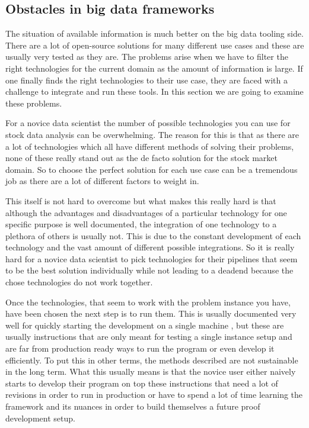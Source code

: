 \subsection{Obstacles in big data frameworks}

The situation of available information is much better on the big data tooling side.
There are a lot of open-source solutions for many different use cases and these are usually very tested as they are.
The problems arise when we have to filter the right technologies for the current domain as the amount of information is large.
If one finally finds the right technologies to their use case, they are faced with a challenge to integrate and run these tools. 
In this section we are going to examine these problems.

For a novice data scientist the number of possible technologies you can use for stock data analysis can be overwhelming.
The reason for this is that as there are a lot of technologies which all have different methods of solving their problems, none of these really stand out as the de facto solution for the stock market domain.
So to choose the perfect solution for each use case can be a tremendous job as there are a lot of different factors to weight in.

This itself is not hard to overcome but what makes this really hard is that although the advantages and disadvantages of a particular technology for one specific purpose is well documented, the integration of one technology to a plethora of others is usually not.
This is due to the constant development of each technology and the vast amount of different possible integrations.
So it is really hard for a novice data scientist to pick technologies for their pipelines that seem to be the best solution individually while not leading to a deadend because the chose technologies do not work together.

Once the technologies, that seem to work with the problem instance you have, have been chosen the next step is to run them.
This is usually documented very well for quickly starting the development on a single machine \cite{kafka} \cite{flume}, but these are usually instructions that are only meant for testing a single instance setup and are far from production ready ways to run the program or even develop it efficiently.
To put this in other terms, the methods described are not sustainable in the long term.
What this usually means is that the novice user either naively starts to develop their program on top these instructions that need a lot of revisions in order to run in production or have to spend a lot of time learning the framework and its nuances in order to build themselves a future proof development setup.

